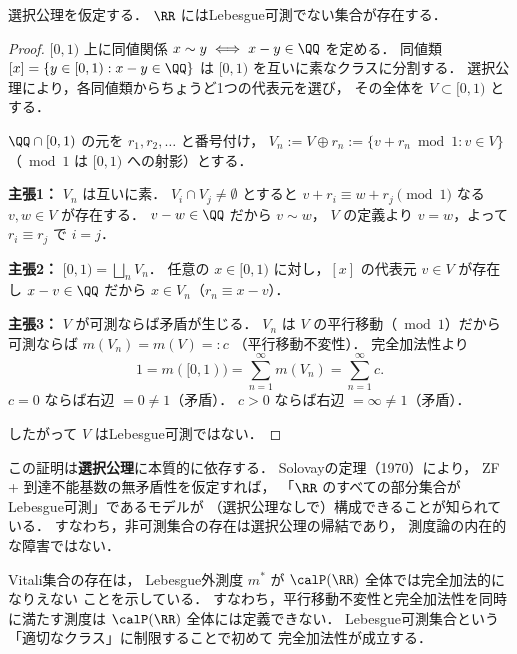 \begin{theorem}[非可測集合の存在]\label{thm:vitali}
選択公理を仮定する．
$\RR$ にはLebesgue可測でない集合が存在する．
\end{theorem}
\begin{proof}
$[0,1)$ 上に同値関係 $x \sim y \iff x - y \in \QQ$ を定める．
同値類 $[x] = \{y \in [0,1) : x - y \in \QQ\}$ は
$[0,1)$ を互いに素なクラスに分割する．
選択公理により，各同値類からちょうど1つの代表元を選び，
その全体を $V \subset [0,1)$ とする．

$\QQ \cap [0,1)$ の元を $r_1, r_2, \ldots$ と番号付け，
$V_n := V \oplus r_n := \{v + r_n \bmod 1 : v \in V\}$
（$\bmod 1$ は $[0,1)$ への射影）とする．

\textbf{主張1：} $V_n$ は互いに素．\quad
$V_i \cap V_j \neq \emptyset$ とすると
$v + r_i \equiv w + r_j \pmod{1}$
なる $v, w \in V$ が存在する．
$v - w \in \QQ$ だから $v \sim w$，
$V$ の定義より $v = w$，よって $r_i \equiv r_j$ で $i = j$．

\textbf{主張2：} $[0,1) = \bigsqcup_n V_n$．\quad
任意の $x \in [0,1)$ に対し，$[x]$ の代表元 $v \in V$ が存在し
$x - v \in \QQ$ だから $x \in V_n$（$r_n \equiv x - v$）．

\textbf{主張3：} $V$ が可測ならば矛盾が生じる．\quad
$V_n$ は $V$ の平行移動（$\bmod 1$）だから
可測ならば $m(V_n) = m(V) =: c$ （平行移動不変性）．
完全加法性より
\[
1 = m([0,1)) = \sum_{n=1}^{\infty} m(V_n)
= \sum_{n=1}^{\infty} c.
\]
$c = 0$ ならば右辺 $= 0 \neq 1$（矛盾）．
$c > 0$ ならば右辺 $= \infty \neq 1$（矛盾）．

したがって $V$ はLebesgue可測ではない．
\end{proof}

\begin{remark}
この証明は\textbf{選択公理}に本質的に依存する．
Solovayの定理（1970）により，
ZF + 到達不能基数の無矛盾性を仮定すれば，
「$\RR$ のすべての部分集合がLebesgue可測」であるモデルが
（選択公理なしで）構成できることが知られている．
すなわち，非可測集合の存在は選択公理の帰結であり，
測度論の内在的な障害ではない．
\end{remark}

\begin{remark}
Vitali集合の存在は，
Lebesgue外測度 $m^*$ が $\calP(\RR)$ 全体では完全加法的になりえない
ことを示している．
すなわち，平行移動不変性と完全加法性を同時に満たす測度は
$\calP(\RR)$ 全体には定義できない．
Lebesgue可測集合という「適切なクラス」に制限することで初めて
完全加法性が成立する．
\end{remark}

